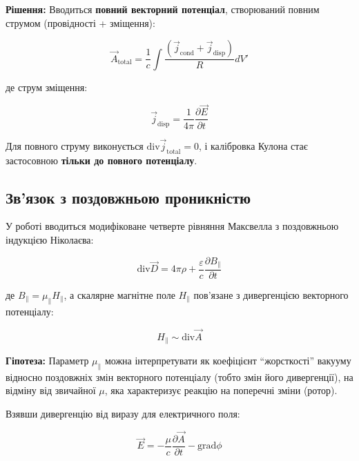 \documentclass[12pt, a4paper]{article}
\begin{document}
\textbf{Рішення:} Вводиться \textbf{повний векторний потенціал}, створюваний повним струмом (провідності + зміщення):

\begin{equation}
\vec{A}_{\text{total}} = \frac{1}{c} \int \frac{(\vec{j}_{\text{cond}} + \vec{j}_{\text{disp}})}{R} dV'
\label{eq:vector_potential_total}
\end{equation}

де струм зміщення:

\begin{equation}
\vec{j}_{\text{disp}} = \frac{1}{4\pi} \frac{\partial \vec{E}}{\partial t}
\label{eq:displacement_current}
\end{equation}

Для повного струму виконується $\text{div} \vec{j}_{\text{total}} = 0$, і калібровка Кулона стає застосовною \textbf{тільки до повного потенціалу}.

\subsection{Зв'язок з поздовжньою проникністю}

У роботі \cite{NikolaevLorentz} вводиться модифіковане четверте рівняння Максвелла з поздовжньою індукцією Ніколаєва:

\begin{equation}
\text{div} \vec{D} = 4\pi\rho + \frac{\varepsilon}{c} \frac{\partial B_{\parallel}}{\partial t}
\label{eq:nikolaev_equation}
\end{equation}

де $B_{\parallel} = \mu_{\parallel} H_{\parallel}$, а скалярне магнітне поле $H_{\parallel}$ пов'язане з дивергенцією векторного потенціалу:

\begin{equation}
H_{\parallel} \sim \text{div} \vec{A}
\label{eq:longitudinal_h}
\end{equation}

\textbf{Гіпотеза:} Параметр $\mu_{\parallel}$ можна інтерпретувати як коефіцієнт ``жорсткості'' вакууму відносно поздовжніх змін векторного потенціалу (тобто змін його дивергенції), на відміну від звичайної $\mu$, яка характеризує реакцію на поперечні зміни (ротор).

Взявши дивергенцію від виразу для електричного поля:

\begin{equation}
\vec{E} = -\frac{\mu}{c} \frac{\partial \vec{A}}{\partial t} - \text{grad} \phi
\label{eq:electric_field_potentials}
\end{equation}
\end{document}
